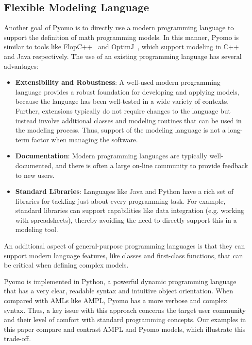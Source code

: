 \subsection{Flexible Modeling Language}

Another goal of Pyomo is to directly use a modern programming language
to support the definition of math programming models.  In this
manner, Pyomo is similar to tools like FlopC++~\citep{flopcpp}
and OptimJ~\citep{OptimJ}, which support modeling in C++ and Java
respectively.  The use of an existing programming language has several
advantages:
\begin{itemize}

\item {\bf Extensibility and Robustness}: A well-used modern programming
language provides a robust foundation for developing and applying models,
because the language has been well-tested in a wide variety of contexts.
Further, extensions typically do not require changes to the language
but instead involve additional classes and modeling routines that can
be used in the modeling process.  Thus, support of the modeling language
is not a long-term factor when managing the software.

\item {\bf Documentation}: Modern programming languages are typically
well-documented, and there is often a large on-line community to provide
feedback to new users.

\item {\bf Standard Libraries}: Languages like Java and Python have a
rich set of libraries for tackling just about every programming task.
For example, standard libraries can support capabilities like data
integration (e.g. working with spreadsheets), thereby avoiding the need
to directly support this in a modeling tool.

\end{itemize}
An additional aspect of general-purpose programming languages is that
they can support modern language features, like classes and first-class
functions, that can be critical when defining complex models.

Pyomo is implemented in Python, a powerful dynamic programming language
that has a very clear, readable syntax and intuitive object orientation.
When compared with AMLs like AMPL, Pyomo has a more verbose and complex
syntax.   Thus, a key issue with this approach concerns the target user
community and their level of comfort with standard programming concepts.
Our examples in this paper compare and contrast AMPL and Pyomo models,
which illustrate this trade-off.


